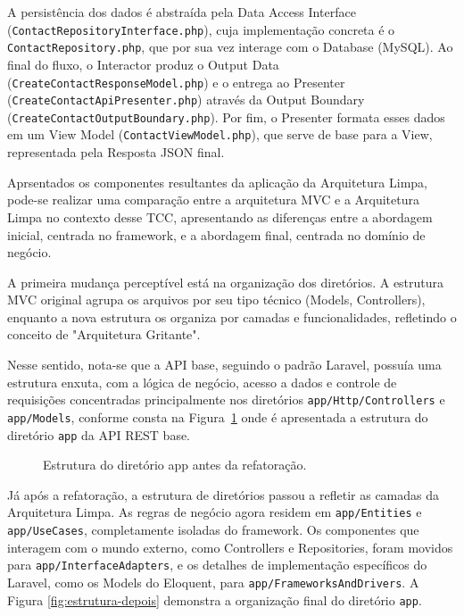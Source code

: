         \par A persistência dos dados é abstraída pela Data Access Interface (\texttt{ContactRepositoryInterface.php}), cuja implementação concreta é o \texttt{ContactRepository.php}, que por sua vez interage com o Database (MySQL). Ao final do fluxo, o Interactor produz o Output Data (\texttt{CreateContactResponseModel.php}) e o entrega ao Presenter (\texttt{CreateContactApiPresenter.php}) através da Output Boundary (\texttt{CreateContactOutputBoundary.php}). Por fim, o Presenter formata esses dados em um View Model (\texttt{ContactViewModel.php}), que serve de base para a View, representada pela Resposta JSON final.

        \par Aprsentados os componentes resultantes da aplicação da Arquitetura Limpa, pode-se realizar uma comparação entre a arquitetura MVC e a Arquitetura Limpa no contexto desse TCC, apresentando as diferenças entre a abordagem inicial, centrada no framework, e a abordagem final, centrada no domínio de negócio. 
        
        \par A primeira mudança perceptível está na organização dos diretórios. A estrutura MVC original agrupa os arquivos por seu tipo técnico (Models, Controllers), enquanto a nova estrutura os organiza por camadas e funcionalidades, refletindo o conceito de "Arquitetura Gritante".
        
        \par Nesse sentido, nota-se que a API base, seguindo o padrão Laravel, possuía uma estrutura enxuta, com a lógica de negócio, acesso a dados e controle de requisições concentradas principalmente nos diretórios \texttt{app/Http/Controllers} e \texttt{app/Models}, conforme consta na Figura~\ref{fig:estrutura-original} onde é apresentada a estrutura do diretório \texttt{app} da API REST base. 

        \begin{figure}[h!]
            \caption{Estrutura do diretório app antes da refatoração.}
            \label{fig:estrutura-original}
        \end{figure}

        \par Já após a refatoração, a estrutura de diretórios passou a refletir as camadas da Arquitetura Limpa. As regras de negócio agora residem em \texttt{app/Entities} e \texttt{app/UseCases}, completamente isoladas do framework. Os componentes que interagem com o mundo externo, como Controllers e Repositories, foram movidos para \texttt{app/InterfaceAdapters}, e os detalhes de implementação específicos do Laravel, como os Models do Eloquent, para \texttt{app/FrameworksAndDrivers}. A Figura \ref{fig:estrutura-depois} demonstra a organização final do diretório \texttt{app}.

